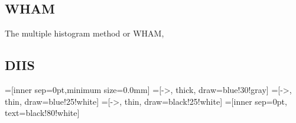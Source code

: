 \documentclass[aip,jcp,preprint,superscriptaddress]{revtex4-1}
\begin{document}
\subsection{WHAM}



The multiple histogram method or WHAM,



\subsection{DIIS}


=[inner sep=0pt,minimum size=0.0mm]
=[->, thick, draw=blue!30!gray]
=[->, thin, draw=blue!25!white]
=[->, thin, draw=black!25!white]
=[inner sep=0pt, text=black!80!white]
\end{document}
